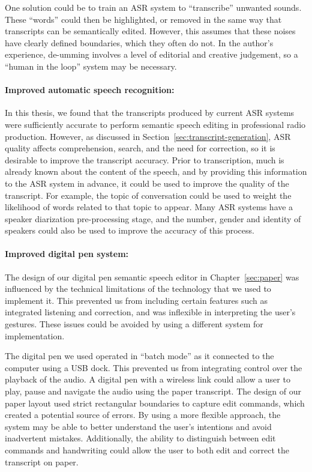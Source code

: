 One solution could be to train an
ASR system to ``transcribe'' unwanted sounds. These ``words'' could then be highlighted, or removed in the same way
that transcripts can be semantically edited.  However, this assumes that these noises have clearly defined boundaries,
which they often do not.  In the author's experience, de-umming involves a level of editorial and creative judgement,
so a ``human in the loop'' system may be necessary.

\paragraph{Improved automatic speech recognition:}

In this thesis, we found that the transcripts produced by current ASR systems were sufficiently accurate to perform
semantic speech editing in professional radio production. However, as discussed in
Section~\ref{sec:transcript-generation}, ASR quality affects comprehension, search, and the need for correction, so it
is desirable to improve the transcript accuracy. Prior to transcription, much is already known about the content of the
speech, and by providing this information to the ASR system in advance, it could be used to improve the quality of the
transcript.  For example, the topic of conversation could be used to weight the likelihood of words related to that
topic to appear.  Many ASR systems have a speaker diarization pre-processing stage, and the number, gender and identity
of speakers could also be used to improve the accuracy of this process.

\paragraph{Improved digital pen system:}

The design of our digital pen semantic speech editor in Chapter~\ref{sec:paper} was influenced by the technical
limitations of the technology that we used to implement it.  This prevented us from including certain features such as
integrated listening and correction, and was inflexible in interpreting the user's gestures.  These issues could be
avoided by using a different system for implementation.

The digital pen we used operated in ``batch mode'' as it connected to the
computer using a USB dock. This prevented us from integrating control over the playback of the audio. A digital pen
with a wireless link could allow a user to play, pause and navigate the audio using the paper transcript.  The design
of our paper layout used strict rectangular boundaries to capture edit commands, which created a potential source of
errors. By using a more flexible approach, the system may be able to better understand the user's intentions and avoid
inadvertent mistakes.  Additionally, the ability to distinguish between edit commands and handwriting could allow the
user to both edit and correct the transcript on paper.

